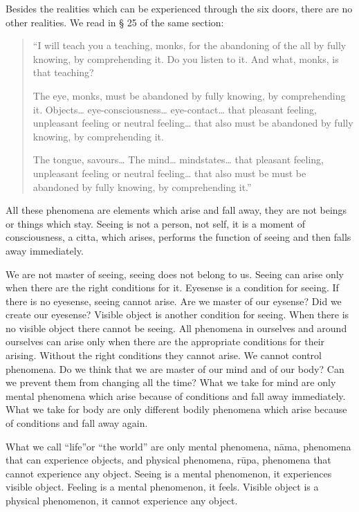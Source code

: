 Besides the realities which can be experienced through the six doors,
there are no other realities. We read in § 25 of the same section:

\begin{quote}

``I will teach you a teaching, monks, for the abandoning of the all by
fully knowing, by comprehending it. Do you listen to it. And what,
monks, is that teaching?

The eye, monks, must be abandoned by fully knowing, by comprehending it.
Objects\ldots{} eye-consciousness\ldots{} eye-contact\ldots{} that
pleasant feeling, unpleasant feeling or neutral feeling\ldots{} that
also must be abandoned by fully knowing, by comprehending it.

The tongue, savours\ldots{} The mind\ldots{} mindstates\ldots{} that
pleasant feeling, unpleasant feeling or neutral feeling\ldots{} that
also must be must be abandoned by fully knowing, by comprehending it.''

\end{quote}

All these phenomena are elements which arise and fall away, they are not
beings or things which stay. Seeing is not a person, not self, it is a
moment of consciousness, a citta, which arises, performs the function of
seeing and then falls away immediately.

We are not master of seeing, seeing does not belong to us. Seeing can
arise only when there are the right conditions for it. Eyesense is a
condition for seeing. If there is no eyesense, seeing cannot arise. Are
we master of our eysense? Did we create our eyesense? Visible object is
another condition for seeing. When there is no visible object there
cannot be seeing. All phenomena in ourselves and around ourselves can
arise only when there are the appropriate conditions for their arising.
Without the right conditions they cannot arise. We cannot control
phenomena. Do we think that we are master of our mind and of our body?
Can we prevent them from changing all the time? What we take for mind
are only mental phenomena which arise because of conditions and fall
away immediately. What we take for body are only different bodily
phenomena which arise because of conditions and fall away again.

What we call ``life''or ``the world'' are only mental phenomena, nāma,
phenomena that can experience objects, and physical phenomena, rūpa,
phenomena that cannot experience any object. Seeing is a mental
phenomenon, it experiences visible object. Feeling is a mental
phenomenon, it feels. Visible object is a physical phenomenon, it cannot
experience any object.

